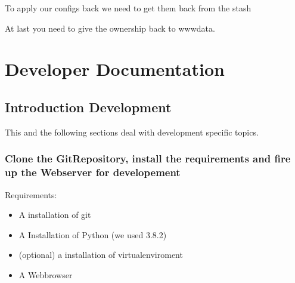 \documentclass[letterpaper,10pt,english]{sphinxmanual}
\begin{document}
To apply our configs back we need to get them back from the stash
\begin{quote}

\end{quote}
\begin{description}
\item[{At last you need to give the ownership back to www\sphinxhyphen{}data.}] \leavevmode
{}

\end{description}


\chapter{Developer Documentation}
\label{\detokenize{masterDeveloperDoc:developer-documentation}}\label{\detokenize{masterDeveloperDoc::doc}}

\section{Introduction Development}
\label{\detokenize{masterDeveloperDoc:introduction-development}}
This and the following sections deal with development specific topics.


\subsection{Clone the Git\sphinxhyphen{}Repository, install the requirements and fire up the Webserver for developement}
\label{\detokenize{masterDeveloperDoc:clone-the-git-repository-install-the-requirements-and-fire-up-the-webserver-for-developement}}
Requirements:
\begin{itemize}
\item {} 
A installation of git

\item {} 
A Installation of Python (we used 3.8.2)

\item {} 
(optional) a installation of virtualenviroment

\item {} 
A Webbrowser

\end{itemize}
\end{document}
